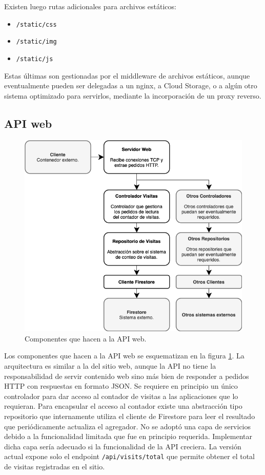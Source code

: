 \documentclass[11pt]{scrartcl}
\begin{document}
Existen luego rutas adicionales para archivos estáticos:

\begin{itemize}
\item \texttt{/static/css}
\item \texttt{/static/img}
\item \texttt{/static/js}
\end{itemize}

Estas últimas son gestionadas por el middleware de archivos estáticos, aunque eventualmente pueden ser delegadas a un nginx, a Cloud Storage, o a algún otro sistema optimizado para servirlos, mediante la incorporación de un proxy reverso.

\subsection{API web}

\begin{figure}
\begin{center}
\includegraphics[width=\linewidth]{img/api-component}
\end{center}
\caption{Componentes que hacen a la API web.}
\label{fig:api}
\end{figure}

Los componentes que hacen a la API web se esquematizan en la figura \ref{fig:api}. La arquitectura es similar a la del sitio web, aunque la API no tiene la responsabilidad de servir contenido web sino más bien de responder a pedidos HTTP con respuestas en formato JSON. Se requiere en principio un único controlador para dar acceso al contador de visitas a las aplicaciones que lo requieran. Para encapsular el acceso al contador existe una abstracción tipo repositorio que internamente utiliza el cliente de Firestore para leer el resultado que periódicamente actualiza el agregador. No se adoptó una capa de servicios debido a la funcionalidad limitada que fue en principio requerida. Implementar dicha capa sería adecuado si la funcionalidad de la API creciera. La versión actual expone solo el endpoint \texttt{/api/visits/total} que permite obtener el total de visitas registradas en el sitio.
\end{document}

